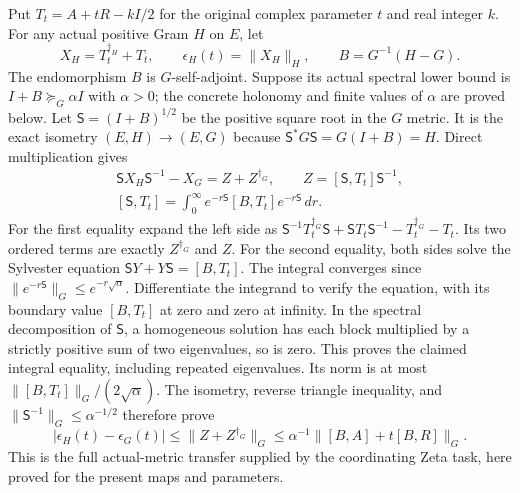 Put $T_t=A+tR-kI/2$ for the original complex parameter $t$ and real
integer $k$. For any actual positive Gram $H$ on $E$, let
\[
 X_H=T_t^{\dagger_H}+T_t,
 \qquad \epsilon_H(t)=\|X_H\|_H,
 \qquad B=G^{-1}(H-G).
 \tag{HG8}
\]
The endomorphism $B$ is $G$-self-adjoint. Suppose its actual spectral
lower bound is $I+B\succeq_G\alpha I$ with $\alpha>0$; the concrete
holonomy and finite values of $\alpha$ are proved below. Let
$\mathsf S=(I+B)^{1/2}$ be the positive square root in the $G$ metric.
It is the exact isometry $(E,H)\to(E,G)$ because
$\mathsf S^*G\mathsf S=G(I+B)=H$. Direct multiplication gives
\[
\begin{gathered}
 \mathsf S X_H\mathsf S^{-1}-X_G=Z+Z^{\dagger_G},
 \qquad Z=[\mathsf S,T_t]\mathsf S^{-1},\\
 [\mathsf S,T_t]=\int_0^\infty
   e^{-r\mathsf S}[B,T_t]e^{-r\mathsf S}\,dr .
\end{gathered}\tag{HG9}
\]
For the first equality expand the left side as
$\mathsf S^{-1}T_t^{\dagger_G}\mathsf S+
\mathsf ST_t\mathsf S^{-1}-T_t^{\dagger_G}-T_t$.
Its two ordered terms are exactly $Z^{\dagger_G}$ and $Z$.
For the second equality, both sides solve the Sylvester equation
$\mathsf S Y+Y\mathsf S=[B,T_t]$.
The integral converges since
$\|e^{-r\mathsf S}\|_G\le e^{-r\sqrt\alpha}$.
Differentiate the integrand to verify the equation, with its boundary
value $[B,T_t]$ at zero and zero at infinity. In the spectral
decomposition of $\mathsf S$, a homogeneous solution has each block
multiplied by a strictly positive sum of two eigenvalues, so is zero.
This proves the claimed integral equality, including repeated eigenvalues.
Its norm is at most $\|[B,T_t]\|_G/(2\sqrt\alpha)$.
The isometry, reverse triangle inequality, and
$\|\mathsf S^{-1}\|_G\le\alpha^{-1/2}$ therefore prove
\[
 |\epsilon_H(t)-\epsilon_G(t)|
 \le\|Z+Z^{\dagger_G}\|_G
 \le\alpha^{-1}\|[B,A]+t[B,R]\|_G .
 \tag{HG10}
\]
This is the full actual-metric transfer supplied by the coordinating
Zeta task, here proved for the present maps and parameters.

